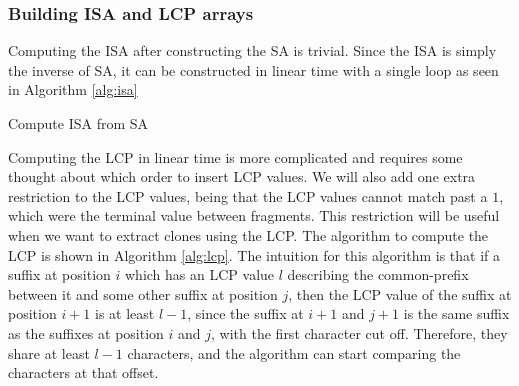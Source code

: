 \subsubsection{Building ISA and LCP arrays}

Computing the ISA after constructing the SA is trivial. Since the ISA is simply the inverse
of SA, it can be constructed in linear time with a single loop as seen in Algorithm
\ref{alg:isa}

\begin{algorithm}[htp]
  \SetAlgoLined\DontPrintSemicolon

  \vspace{0.5cm}
  \caption{Compute ISA from SA}
  \label{alg:isa}
\end{algorithm}


Computing the LCP in linear time is more complicated and requires some thought about which
order to insert LCP values. We will also add one extra restriction to the LCP values,
being that the LCP values cannot match past a $1$, which were the terminal value between
fragments. This restriction will be useful when we want to extract clones using the LCP.
The algorithm to compute the LCP is shown in Algorithm \ref{alg:lcp}. The intuition for
this algorithm is that if a suffix at position $i$ which has an LCP value $l$ describing
the common-prefix between it and some other suffix at position $j$, then the LCP value of
the suffix at position $i + 1$ is at least $l - 1$, since the suffix at $i + 1$ and $j +
1$ is the same suffix as the suffixes at position $i$ and $j$, with the first character
cut off. Therefore, they share at least $l - 1$ characters, and the algorithm can start
comparing the characters at that offset.

